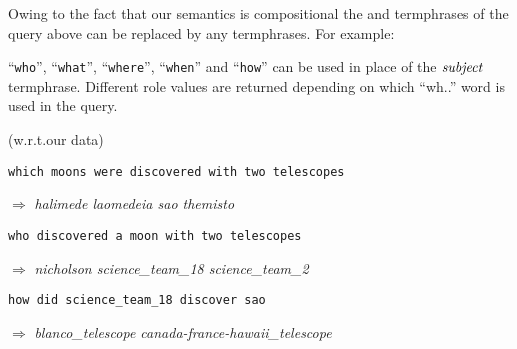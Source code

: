 \documentclass[../main.tex]{subfiles}
\begin{document}
\begin{refsection}
Owing to the fact that our semantics is compositional the  and  termphrases of the query above can be replaced by any termphrases. For example:

\examplespacing



\examplespacing

\noindent ``\texttt{who}'', ``\texttt{what}'', ``\texttt{where}'', ``\texttt{when}'' and ``\texttt{how}'' can be used in place of the $\operatorname{\mathit{subject}}$ termphrase. Different role values are returned depending on which ``wh..'' word is used in the query.

\examplespacing



 (w.r.t.our data)



\texttt{which moons were discovered with two telescopes}

$\Rightarrow$ \textit{halimede laomedeia sao themisto}


\texttt{who discovered a moon with two telescopes}

$\Rightarrow$ \textit{nicholson science\_team\_18 science\_team\_2}





\noindent \texttt{how did science\_team\_18 discover sao}

$\Rightarrow$ \textit{blanco\_telescope canada-france-hawaii\_telescope}


\end{refsection}
\end{document}
